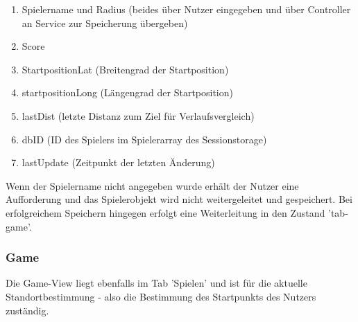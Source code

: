 \begin{enumerate}
\item Spielername und Radius (beides über Nutzer eingegeben und über Controller an Service zur Speicherung übergeben)
\item Score
\item StartpositionLat (Breitengrad der Startposition)
\item startpositionLong (Längengrad der Startposition)
\item lastDist (letzte Distanz zum Ziel für Verlaufsvergleich)
\item dbID (ID des Spielers im Spielerarray des Sessionstorage)
\item lastUpdate (Zeitpunkt der letzten Änderung)
\end{enumerate}

Wenn der Spielername nicht angegeben wurde erhält der Nutzer eine Aufforderung und das Spielerobjekt wird nicht weitergeleitet und gespeichert. Bei erfolgreichem Speichern hingegen erfolgt eine Weiterleitung in den Zustand 'tab-game'.
\subsubsection{Game}
Die Game-View liegt ebenfalls im Tab 'Spielen' und ist für die aktuelle Standortbestimmung - also die Bestimmung des Startpunkts des Nutzers zuständig.

